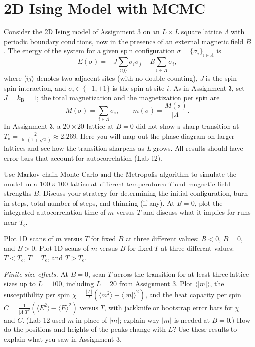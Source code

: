 \newpage
\section{2D Ising Model with MCMC}

Consider the 2D Ising model of Assignment 3 on an $L\times L$ square lattice $\Lambda$ with periodic boundary conditions, now in the presence of an external magnetic field $B$.
The energy of the system for a given spin configuration $\sigma = \{\sigma_i\}_{i\in \Lambda}$ is
\begin{equation}
  E(\sigma) = -J\sum_{\langle ij\rangle} \sigma_i\sigma_j - B\sum_{i\in \Lambda} \sigma_i,
\end{equation}
where $\langle i j \rangle$ denotes two adjacent sites (with no double counting), $J$ is the spin-spin interaction, and $\sigma_i \in \{ -1, +1\}$ is the spin at site $i$.
As in Assignment 3, set $J = k_\mathrm{B} = 1$; the total magnetization and the magnetization per spin are
\begin{equation}
  M(\sigma) = \sum_{i\in \Lambda} \sigma_i, \qquad m(\sigma) = \frac{M(\sigma)}{|\Lambda|}.
\end{equation}
In Assignment 3, a $20\times 20$ lattice at $B=0$ did not show a sharp transition at $T_\mathrm{c}=\frac{2}{\ln(1+\sqrt{2})}\approx 2.269$.
Here you will map out the phase diagram on larger lattices and see how the transition sharpens as $L$ grows.
All results should have error bars that account for autocorrelation (Lab 12).

\begin{problem}
  Use Markov chain Monte Carlo and the Metropolis algorithm to simulate the model on a $100\times 100$ lattice at different temperatures $T$ and magnetic field strengths $B$.
  Discuss your strategy for determining the initial configuration, burn-in steps, total number of steps, and thinning (if any).
  At $B=0$, plot the integrated autocorrelation time of $m$ versus $T$ and discuss what it implies for runs near $T_\mathrm{c}$.
\end{problem}

\begin{problem}
  Plot 1D scans of $m$ versus $T$ for fixed $B$ at three different values: $B<0$, $B=0$, and $B>0$.
  Plot 1D scans of $m$ versus $B$ for fixed $T$ at three different values: $T<T_\mathrm{c}$, $T=T_\mathrm{c}$, and $T>T_\mathrm{c}$.
\end{problem}

\begin{problem}
  \emph{Finite-size effects.}
  At $B=0$, scan $T$ across the transition for at least three lattice sizes up to $L=100$, including $L=20$ from Assignment 3.
  Plot $\langle|m|\rangle$, the susceptibility per spin $\chi = \frac{|\Lambda|}{T}\left(\langle m^2\rangle - \langle|m|\rangle^2\right)$, and the heat capacity per spin $C = \frac{1}{|\Lambda|\,T^2}\left(\langle E^2\rangle - \langle E\rangle^2\right)$ versus $T$, with jackknife or bootstrap error bars for $\chi$ and $C$.
  (Lab 12 used $m$ in place of $|m|$; explain why $|m|$ is needed at $B=0$.)
  How do the positions and heights of the peaks change with $L$?
  Use these results to explain what you saw in Assignment 3.
\end{problem}

